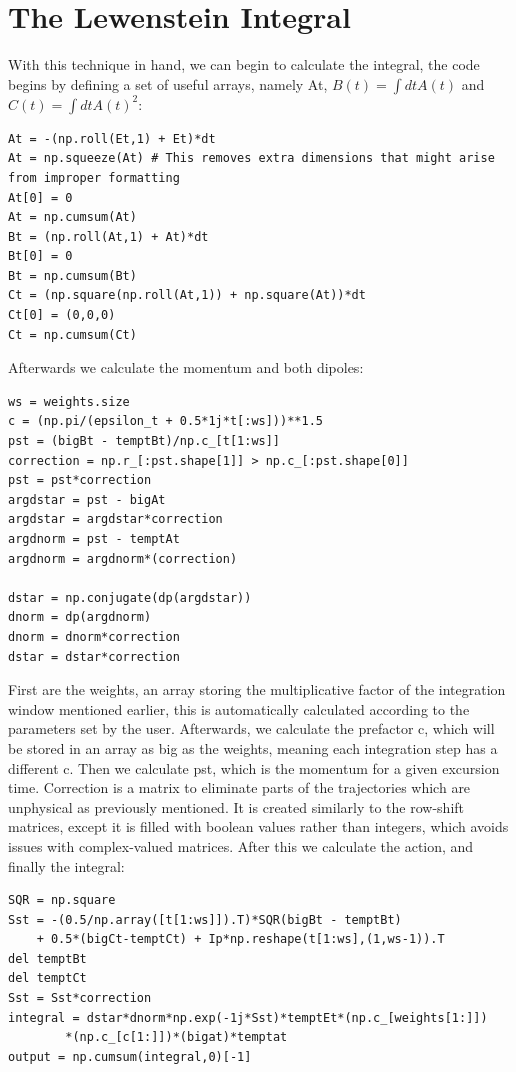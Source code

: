 \documentclass[11pt,a4paper]{report}
\begin{document}
\newpage
{}
\section{The Lewenstein Integral}
With this technique in hand, we can begin to calculate the integral, the code begins by defining a set of useful arrays, namely At, $B(t) = \int dt A(t)$ and $C(t) = \int dt A(t)^2$:
\begin{verbatim}
At = -(np.roll(Et,1) + Et)*dt 
At = np.squeeze(At) # This removes extra dimensions that might arise from improper formatting 
At[0] = 0
At = np.cumsum(At)
Bt = (np.roll(At,1) + At)*dt
Bt[0] = 0
Bt = np.cumsum(Bt)
Ct = (np.square(np.roll(At,1)) + np.square(At))*dt
Ct[0] = (0,0,0)
Ct = np.cumsum(Ct)
\end{verbatim}
Afterwards we calculate the momentum and both dipoles:
\begin{verbatim}
ws = weights.size
c = (np.pi/(epsilon_t + 0.5*1j*t[:ws]))**1.5
pst = (bigBt - temptBt)/np.c_[t[1:ws]]
correction = np.r_[:pst.shape[1]] > np.c_[:pst.shape[0]]    
pst = pst*correction
argdstar = pst - bigAt
argdstar = argdstar*correction
argdnorm = pst - temptAt
argdnorm = argdnorm*(correction)

dstar = np.conjugate(dp(argdstar))
dnorm = dp(argdnorm)
dnorm = dnorm*correction
dstar = dstar*correction
\end{verbatim}

First are the weights, an array storing the multiplicative factor of the integration window mentioned earlier, this is automatically calculated according to the parameters set by the user. Afterwards, we calculate the prefactor c, which will be stored in an array as big as the weights, meaning each integration step has a different c. Then we calculate pst, which is the momentum for a given excursion time. Correction is a matrix to eliminate parts of the trajectories which are unphysical as previously mentioned. It is created similarly to the row-shift matrices, except it is filled with boolean values rather than integers, which avoids issues with complex-valued matrices. After this we calculate the action, and finally the integral:

\begin{verbatim}
SQR = np.square
Sst = -(0.5/np.array([t[1:ws]]).T)*SQR(bigBt - temptBt) 
	+ 0.5*(bigCt-temptCt) + Ip*np.reshape(t[1:ws],(1,ws-1)).T
del temptBt
del temptCt
Sst = Sst*correction
integral = dstar*dnorm*np.exp(-1j*Sst)*temptEt*(np.c_[weights[1:]])
		*(np.c_[c[1:]])*(bigat)*temptat
output = np.cumsum(integral,0)[-1]
\end{verbatim}
\end{document}
